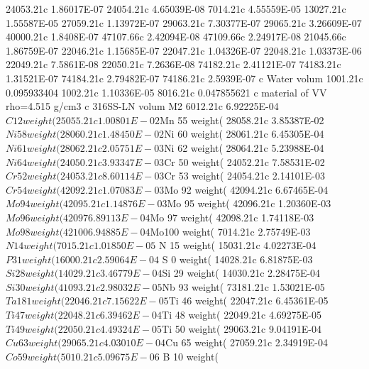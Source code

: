 \begin{python}
24053.21c 1.86017E-07
24054.21c 4.65039E-08
7014.21c 4.55559E-05
13027.21c 1.55587E-05
27059.21c 1.13972E-07
29063.21c 7.30377E-07
29065.21c 3.26609E-07
40000.21c 1.8408E-07 
47107.66c 2.42094E-08
47109.66c 2.24917E-08
21045.66c 1.86759E-07
22046.21c 1.15685E-07
22047.21c 1.04326E-07
22048.21c 1.03373E-06
22049.21c 7.5861E-08 
22050.21c 7.2636E-08 
74182.21c 2.41121E-07
74183.21c 1.31521E-07
74184.21c 2.79482E-07
74186.21c 2.5939E-07
c Water volum%
1001.21c 0.095933404
1002.21c 1.10336E-05
8016.21c 0.047855621
c material of VV rho=4.515 g/cm3
c 316SS-LN volum%
M2 6012.21c 6.92225E-04 $ C 12 weight(%
25055.21c 1.00801E-02 $Mn 55 weight(%
28058.21c 3.85387E-02 $Ni 58 weight(%
28060.21c 1.48450E-02 $Ni 60 weight(%
28061.21c 6.45305E-04 $Ni 61 weight(%
28062.21c 2.05751E-03 $Ni 62 weight(%
28064.21c 5.23988E-04 $Ni 64 weight(%
24050.21c 3.93347E-03 $Cr 50 weight(%
24052.21c 7.58531E-02 $Cr 52 weight(%
24053.21c 8.60114E-03 $Cr 53 weight(%
24054.21c 2.14101E-03 $Cr 54 weight(%
42092.21c 1.07083E-03 $Mo 92 weight(%
42094.21c 6.67465E-04 $Mo 94 weight(%
42095.21c 1.14876E-03 $Mo 95 weight(%
42096.21c 1.20360E-03 $Mo 96 weight(%
42097 6.89113E-04 $Mo 97 weight(%
42098.21c 1.74118E-03 $Mo 98 weight(%
42100 6.94885E-04 $Mo100 weight(%
7014.21c 2.75749E-03 $ N 14 weight(%
7015.21c 1.01850E-05 $ N 15 weight(%
15031.21c 4.02273E-04 $ P 31 weight(%
16000.21c 2.59064E-04 $ S  0 weight(%
14028.21c 6.81875E-03 $Si 28 weight(%
14029.21c 3.46779E-04 $Si 29 weight(%
14030.21c 2.28475E-04 $Si 30 weight(%
41093.21c 2.98032E-05 $Nb 93 weight(%
73181.21c 1.53021E-05 $Ta181 weight(%
22046.21c 7.15622E-05 $Ti 46 weight(%
22047.21c 6.45361E-05 $Ti 47 weight(%
22048.21c 6.39462E-04 $Ti 48 weight(%
22049.21c 4.69275E-05 $Ti 49 weight(%
22050.21c 4.49324E-05 $Ti 50 weight(%
29063.21c 9.04191E-04 $Cu 63 weight(%
29065.21c 4.03010E-04 $Cu 65 weight(%
27059.21c 2.34919E-04 $Co 59 weight(%
5010.21c 5.09675E-06 $ B 10 weight(%

\end{python}
